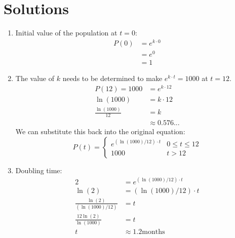 \section{Solutions}
\begin{enumerate}
  \item Initial value of the population at $t=0$:
  \begin{align}
    P(0) &= e^{k \cdot 0} \\
         &= e^0 \\
         &= 1
  \end{align}
  \item The value of $k$ needs to be determined to make $e^{k \cdot t}=1000$ at
  $t=12$.
  \begin{align}
    P(12) = 1000 &= e^{k \cdot 12} \\
    \ln(1000) &= k \cdot 12 \\
    \frac{\ln(1000)}{12} &= k \\
      &\approx 0.576...
  \end{align}
  We can substitute this back into the original equation:
  \[
  P(t) =
  \begin{cases}
    e^{ (\ln(1000)/12)\cdot t} & 0 \leq t \leq 12 \\
    1000   & t > 12
  \end{cases}
  \]
  \item Doubling time:
  \begin{align}
    2 &= e^{ (\ln(1000)/12)\cdot t} \\
    \ln(2) &= (\ln(1000)/12)\cdot t \\
    \frac{\ln(2)}{(\ln(1000)/12)} &= t \\
    \frac{12\ln(2)}{\ln(1000)} &= t \\
    t &\approx 1.2 \text{months}
  \end{align}


\end{enumerate}
